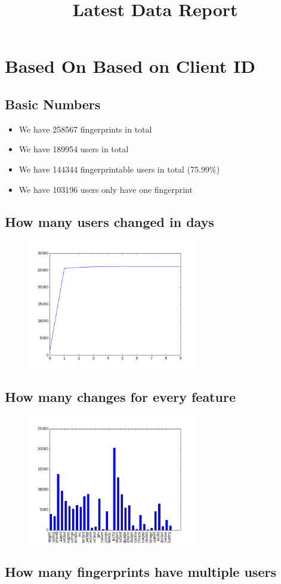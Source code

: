 \documentclass[10pt, conference, compsocconf]{IEEEtran}
\begin{document}
\title{Latest Data Report}
\author{
}
\maketitle
\section{Based On Based on Client ID}
\subsection{Basic Numbers}
\begin{itemize}\item We have 258567 fingerprints in total\item We have 189954 users in total\item We have 144344 fingerprintable users in total (75.99\%)\item We have 103196 users only have one fingerprint \end{itemize}\subsection{How many users changed in days}
\begin{figure}[H]\centering\includegraphics[width=75mm,scale=0.5]{BasedonClientIDchangebytime}\end{figure}\subsection{How many changes for every feature}
\begin{figure}[H]\centering\includegraphics[width=75mm,scale=0.5]{BasedonClientIDfeaturechange}\end{figure}\subsection{How many fingerprints have multiple users}
\end{document}
